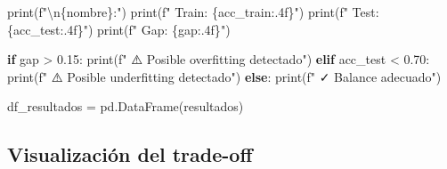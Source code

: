 \documentclass[
  doc,
  floatsintext,
  longtable,
  a4paper,
  nolmodern,
  notxfonts,
  notimes,
  12pt,
  colorlinks=true,linkcolor=blue,citecolor=blue,urlcolor=blue]{apa7}
\newenvironment{Shaded}{\begin{snugshade}}{\end{snugshade}}
\newcommand{\BuiltInTok}[1]{\textcolor[rgb]{0.00,0.23,0.31}{#1}}
\newcommand{\CharTok}[1]{\textcolor[rgb]{0.13,0.47,0.30}{#1}}
\newcommand{\ControlFlowTok}[1]{\textcolor[rgb]{0.00,0.23,0.31}{\textbf{#1}}}
\newcommand{\FloatTok}[1]{\textcolor[rgb]{0.68,0.00,0.00}{#1}}
\newcommand{\NormalTok}[1]{\textcolor[rgb]{0.00,0.23,0.31}{#1}}
\newcommand{\OperatorTok}[1]{\textcolor[rgb]{0.37,0.37,0.37}{#1}}
\newcommand{\SpecialCharTok}[1]{\textcolor[rgb]{0.37,0.37,0.37}{#1}}
\newcommand{\SpecialStringTok}[1]{\textcolor[rgb]{0.13,0.47,0.30}{#1}}
\begin{document}
\begin{Shaded}
\begin{Highlighting}[]
    \BuiltInTok{print}\NormalTok{(}\SpecialStringTok{f"}\CharTok{\textbackslash{}n}\SpecialCharTok{\{}\NormalTok{nombre}\SpecialCharTok{\}}\SpecialStringTok{:"}\NormalTok{)}
    \BuiltInTok{print}\NormalTok{(}\SpecialStringTok{f"  Train: }\SpecialCharTok{\{}\NormalTok{acc\_train}\SpecialCharTok{:.4f\}}\SpecialStringTok{"}\NormalTok{)}
    \BuiltInTok{print}\NormalTok{(}\SpecialStringTok{f"  Test:  }\SpecialCharTok{\{}\NormalTok{acc\_test}\SpecialCharTok{:.4f\}}\SpecialStringTok{"}\NormalTok{)}
    \BuiltInTok{print}\NormalTok{(}\SpecialStringTok{f"  Gap:   }\SpecialCharTok{\{}\NormalTok{gap}\SpecialCharTok{:.4f\}}\SpecialStringTok{"}\NormalTok{)}
    
    \ControlFlowTok{if}\NormalTok{ gap }\OperatorTok{\textgreater{}} \FloatTok{0.15}\NormalTok{:}
        \BuiltInTok{print}\NormalTok{(}\SpecialStringTok{f"  ⚠️  Posible overfitting detectado"}\NormalTok{)}
    \ControlFlowTok{elif}\NormalTok{ acc\_test }\OperatorTok{\textless{}} \FloatTok{0.70}\NormalTok{:}
        \BuiltInTok{print}\NormalTok{(}\SpecialStringTok{f"  ⚠️  Posible underfitting detectado"}\NormalTok{)}
    \ControlFlowTok{else}\NormalTok{:}
        \BuiltInTok{print}\NormalTok{(}\SpecialStringTok{f"  ✓ Balance adecuado"}\NormalTok{)}

\NormalTok{df\_resultados }\OperatorTok{=}\NormalTok{ pd.DataFrame(resultados)}
\end{Highlighting}
\end{Shaded}

\subsection{Visualización del
trade-off}\label{visualizaciuxf3n-del-trade-off}
\end{document}
